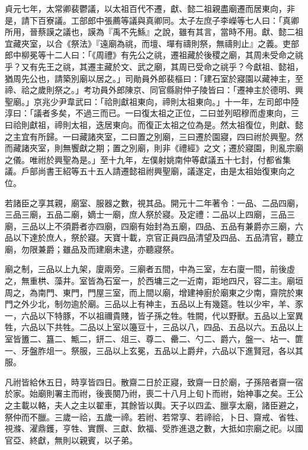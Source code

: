 \begin{pinyinscope}
 貞元七年，太常卿裴鬱議，以太祖百代不遷，獻、懿二祖親盡廟遷而居東向，非是，請下百寮議。工部郎中張薦等議與真卿同。太子左庶子李嶸等七人曰：「真卿所用，晉蔡謨之議也，謨為『禹不先鯀』之說，雖有其言，當時不用。獻、懿二祖宜藏夾室，以合《祭法》『遠廟為祧，而壇、墠有禱則祭，無禱則止』之義。吏部郎中柳冕等十二人曰：「《周禮》有先公之祧，遷祖藏於後稷之廟，其周未受命之祧乎？又有先王之祧，其遷主藏於文、武之廟，其周已受命之祧乎？今獻祖、懿祖，猶周先公也，請築別廟以居之。」司勛員外郎裴樞曰：「建石室於寢園以藏神主，至禘、祫之歲則祭之。」考功員外郎陳京、同官縣尉仲子陵皆曰：「遷神主於德明、興聖廟。」京兆少尹韋武曰：「祫則獻祖東向，禘則太祖東向。」十一年，左司郎中陸淳曰：「議者多矣，不過三而已。一曰復太祖之正位，二曰並列昭穆而虛東向，三曰祫則獻祖，禘則太祖，迭居東向。而復正太祖之位為是。然太祖復位，則獻、懿之主宜有所歸。一曰藏諸夾室，二曰置之別廟，三曰遷於園寢，四曰祔於興聖。然而藏諸夾室，則無饗獻之期；置之別廟，則非《禮經》之文；遷於寢園，則亂宗廟之儀。唯祔於興聖為是。」至十九年，左僕射姚南仲等獻議五十七封，付都省集議。戶部尚書王紹等五十五人請遷懿祖祔興聖廟，議遂定，由是太祖始復東向之位。



 若諸臣之享其親，廟室、服器之數，視其品。開元十二年著令：一品、二品四廟，三品三廟，五品二廟，嫡士一廟，庶人祭於寢。及定禮：二品以上四廟，三品三廟，三品以上不須爵者亦四廟，四廟有始封為五廟，四品、五品有兼爵亦三廟，六品以下達於庶人，祭於寢。天寶十載，京官正員四品清望及四品、五品清官，聽立廟，勿限兼爵；雖品及而建廟未逮，亦聽寢祭。



 廟之制，三品以上九架，廈兩旁。三廟者五間，中為三室，左右廈一間，前後虛之，無重栱、藻井。室皆為石室一，於西墉三之一近南，距地四尺，容二主。廟垣周之，為南門、東門，門屋三室，而上間以廟，增建神廚於廟東之少南，齋院於東門之外少北，制勿逾於廟。三品以上有神主，五品以上有幾筵。牲以少牢，羊、豕一，六品以下特豚，不以祖禰貴賤，皆子孫之牲。牲闕，代以野獸。五品以上室異牲，六品以下共牲。二品以上室以籩豆十，三品以八，四品、五品以六。五品以上室皆簠二、簋二、甒二，鈃二、俎三、尊二、罍二、勺二、爵六，盤一、坫一、篚一、牙盤胙俎一。祭服，三品以上玄冕，五品以上爵弁，六品以下進賢冠，各以其服。



 凡祔皆給休五日，時享皆四日。散齋二日於正寢，致齋一日於廟，子孫陪者齋一宿於家。始廟則署主而祔，後喪闋乃祔，喪二十八月上旬卜而祔，始神事之矣。王公之主載以輅，夫人之主以翟車，其餘皆以輿。天子以四孟、臘享太廟，諸臣避之，祭仲而不臘。三歲一祫，五歲一禘。若祔、若常享、若禘祫，卜日、齋戒、省牲、視滌、濯鼎鑊，亨牲、實饌、三獻、飲福、受胙進退之數，大抵如宗廟之祀。以國官亞、終獻，無則以親賓，以子弟。




\end{pinyinscope}
